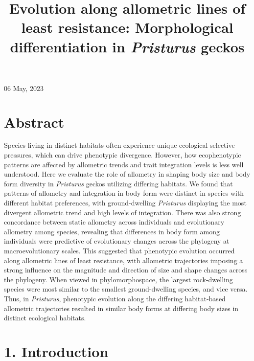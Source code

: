 \documentclass[
  11pt,
]{article}
\title{Evolution along allometric lines of least resistance: Morphological
differentiation in \emph{Pristurus} geckos}
\author{}
\date{\vspace{-2.5em}}
\begin{document}
\maketitle

\begin{center}06 May, 2023\end{center}

\newpage

\hypertarget{abstract}{%
\section{Abstract}\label{abstract}}

Species living in distinct habitats often experience unique ecological
selective pressures, which can drive phenotypic divergence. However, how
ecophenotypic patterns are affected by allometric trends and trait
integration levels is less well understood. Here we evaluate the role of
allometry in shaping body size and body form diversity in
\emph{Pristurus} geckos utilizing differing habitats. We found that
patterns of allometry and integration in body form were distinct in
species with different habitat preferences, with ground-dwelling
\emph{Pristurus} displaying the most divergent allometric trend and high
levels of integration. There was also strong concordance between static
allometry across individuals and evolutionary allometry among species,
revealing that differences in body form among individuals were
predictive of evolutionary changes across the phylogeny at
macroevolutionary scales. This suggested that phenotypic evolution
occurred along allometric lines of least resistance, with allometric
trajectories imposing a strong influence on the magnitude and direction
of size and shape changes across the phylogeny. When viewed in
phylomorphospace, the largest rock-dwelling species were most similar to
the smallest ground-dwelling species, and vice versa. Thus, in
\emph{Pristurus}, phenotypic evolution along the differing habitat-based
allometric trajectories resulted in similar body forms at differing body
sizes in distinct ecological habitats.

\newpage

\hypertarget{introduction}{%
\section{1. Introduction}\label{introduction}}
\end{document}
